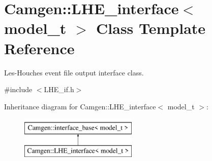 \hypertarget{a00323}{\section{Camgen\-:\-:L\-H\-E\-\_\-interface$<$ model\-\_\-t $>$ Class Template Reference}
\label{a00323}
}


Les-\/\-Houches event file output interface class.  




{\ttfamily \#include $<$L\-H\-E\-\_\-if.\-h$>$}

Inheritance diagram for Camgen\-:\-:L\-H\-E\-\_\-interface$<$ model\-\_\-t $>$\-:\begin{figure}[H]
\begin{center}
\leavevmode
\includegraphics[height=2.000000cm]{a00323}
\end{center}
\end{figure}
